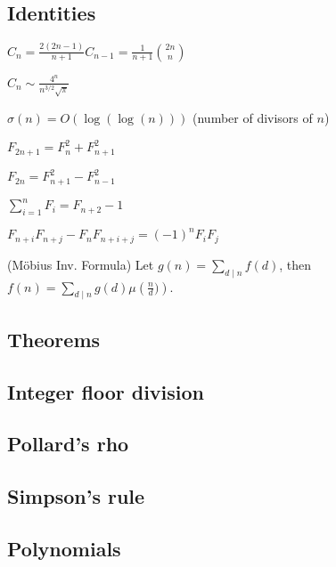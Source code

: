 \subsection{Identities}
{
$C_n = \frac{2(2n-1)}{n+1} C_{n-1} = \frac{1}{n+1} \binom{2n}{n}$

$C_n \sim \frac{4^n}{n^{3/2}\sqrt{\pi}}$

$\sigma(n) = O(\log(\log(n)))$ (number of divisors of $n$)

$F_{2n+1} = F_{n}^2 + F_{n+1}^2$

$F_{2n} = F_{n+1}^2 - F_{n-1}^2$

$\sum_{i=1}^n F_i = F_{n+2}-1$

$F_{n+i}F_{n+j} - F_nF_{n+i+j} = (-1)^n F_iF_j$

(Möbius Inv. Formula)
Let $g(n) = \sum_{d\mid n} f(d)$, then $f(n)=\sum_{d\mid n} g(d) \mu\left(\frac{n}{d})\right)$.
}
\subsection{Theorems}
\subsection{Integer floor division}
\subsection{Pollard's rho}
\subsection{Simpson's rule}
\subsection{Polynomials}
